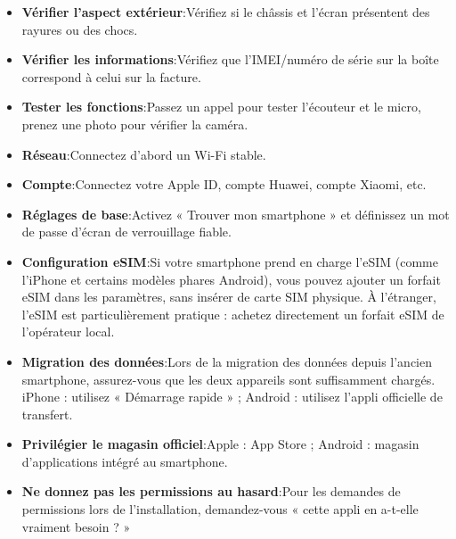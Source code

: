 

\begin{itemize}
  \item \textbf{Vérifier l’aspect extérieur}:Vérifiez si le châssis et l’écran présentent des rayures ou des chocs.
  \item \textbf{Vérifier les informations}:Vérifiez que l’IMEI/numéro de série sur la boîte correspond à celui sur la facture.
  \item \textbf{Tester les fonctions}:Passez un appel pour tester l’écouteur et le micro, prenez une photo pour vérifier la caméra.
\end{itemize}


\begin{itemize}
  \item \textbf{Réseau}:Connectez d'abord un Wi-Fi stable.
  \item \textbf{Compte}:Connectez votre Apple ID, compte Huawei, compte Xiaomi, etc.
  \item \textbf{Réglages de base}:Activez « Trouver mon smartphone » et définissez un mot de passe d'écran de verrouillage fiable.
  \item \textbf{Configuration eSIM}:Si votre smartphone prend en charge l'eSIM (comme l'iPhone et certains modèles phares Android), vous pouvez ajouter un forfait eSIM dans les paramètres, sans insérer de carte SIM physique. À l'étranger, l'eSIM est particulièrement pratique : achetez directement un forfait eSIM de l'opérateur local.
  \item \textbf{Migration des données}:Lors de la migration des données depuis l'ancien smartphone, assurez-vous que les deux appareils sont suffisamment chargés. iPhone : utilisez « Démarrage rapide » ; Android : utilisez l'appli officielle de transfert.
\end{itemize}


\begin{itemize}
  \item \textbf{Privilégier le magasin officiel}:Apple : App Store ; Android : magasin d'applications intégré au smartphone.
  \item \textbf{Ne donnez pas les permissions au hasard}:Pour les demandes de permissions lors de l'installation, demandez-vous « cette appli en a-t-elle vraiment besoin ? »
\end{itemize}
